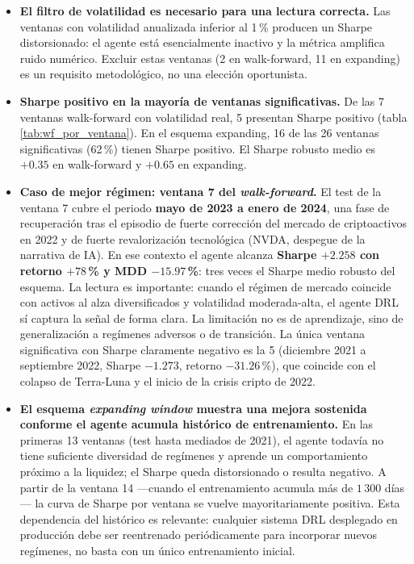 \documentclass[IB,a4paper]{TFUOC}
\begin{document}
\begin{itemize}
    \item \textbf{El filtro de volatilidad es necesario para una lectura correcta.} Las ventanas con volatilidad anualizada inferior al 1\,\% producen un Sharpe distorsionado: el agente está esencialmente inactivo y la métrica amplifica ruido numérico. Excluir estas ventanas (2 en walk-forward, 11 en expanding) es un requisito metodológico, no una elección oportunista.
    \item \textbf{Sharpe positivo en la mayoría de ventanas significativas.} De las 7 ventanas walk-forward con volatilidad real, 5 presentan Sharpe positivo (tabla \ref{tab:wf_por_ventana}). En el esquema expanding, 16 de las 26 ventanas significativas (62\,\%) tienen Sharpe positivo. El Sharpe robusto medio es $+0.35$ en walk-forward y $+0.65$ en expanding.
    \item \textbf{Caso de mejor régimen: ventana 7 del \textit{walk-forward}.} El test de la ventana 7 cubre el periodo \textbf{mayo de 2023 a enero de 2024}, una fase de recuperación tras el episodio de fuerte corrección del mercado de criptoactivos en 2022 y de fuerte revalorización tecnológica (NVDA, despegue de la narrativa de IA). En ese contexto el agente alcanza \textbf{Sharpe $+2.258$ con retorno $+78$\,\% y MDD $-15.97$\,\%}: tres veces el Sharpe medio robusto del esquema. La lectura es importante: cuando el régimen de mercado coincide con activos al alza diversificados y volatilidad moderada-alta, el agente DRL sí captura la señal de forma clara. La limitación no es de aprendizaje, sino de generalización a regímenes adversos o de transición. La única ventana significativa con Sharpe claramente negativo es la 5 (diciembre 2021 a septiembre 2022, Sharpe $-1.273$, retorno $-31.26$\,\%), que coincide con el colapso de Terra-Luna y el inicio de la crisis cripto de 2022.
    \item \textbf{El esquema \textit{expanding window} muestra una mejora sostenida conforme el agente acumula histórico de entrenamiento.} En las primeras 13 ventanas (test hasta mediados de 2021), el agente todavía no tiene suficiente diversidad de regímenes y aprende un comportamiento próximo a la liquidez; el Sharpe queda distorsionado o resulta negativo. A partir de la ventana 14 —cuando el entrenamiento acumula más de $1\,300$ días— la curva de Sharpe por ventana se vuelve mayoritariamente positiva. Esta dependencia del histórico es relevante: cualquier sistema DRL desplegado en producción debe ser reentrenado periódicamente para incorporar nuevos regímenes, no basta con un único entrenamiento inicial.
\end{itemize}
\end{document}
